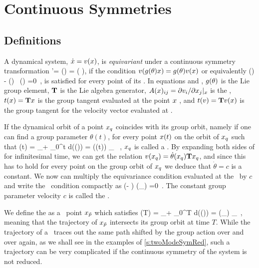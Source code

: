 \section{Continuous Symmetries}
\label{s:symm}

\subsection{Definitions}

A dynamical system, $\dot{x}=v(x)$, is \emph{equivariant} under a continuous
symmetry transformation
\beq
	\ssp'= \LieEl (\theta) \ssp = \exp\left( \theta \Lg\right)\ssp,
if the condition
$v(g (\theta) x ) = g (\theta) v( x ) $
or equivalently 
\beq
  \groupTan(\vel)  - \Mvar(\ssp) \, \groupTan(\ssp) =0
  \,,
is satisfied for every point of its \statesp . In equations 
and , $g (\theta)$ is the Lie group element, $\mathbf{T}$
is the Lie algebra generator, $A(x)_{ij} = {\partial v_i}/{\partial x_j} |_x$
is the \stabmat , $ t(x) = \mathbf{T} x $ is the group tangent evaluated
at the point $x$ , and $ t(v) = \mathbf{T} v(x) $ is the group
tangent for the velocity vector evaluated at \ssp. 

\label{s:relatives}

If the dynamical orbit of a point $x_q$ coincides with its group
orbit, namely if one can find a group parameter $\theta (t)$, for every point $x (t)$
on the orbit of $x_q$ such that
\beq
  \ssp (t) = \ssp_\stagn + \int_0^t d\tau \vel(\ssp (\tau)) = \LieEl (\theta (t)) \ssp_\stagn
  \, ,
 $x_q$ is called a \emph{ \reqv }. By expanding both sides of 
for infinitesimal time, we can get the relation
$v(x_q) = \dot{\theta}(x_q) \mathbf{T} x_q$,
and since this has to hold for every point on the group orbit of $x_q$
we deduce that $\dot{\theta} = c$ is a constant. We now can multiply the equivariance
condition  evaluated at the \reqv\ by $c$ and write the
\reqv\ condition compactly as
\beq
(\velRel \Lg - \Mvar ) \vel (\ssp_\stagn) =0
\,.
The constant group parameter velocity $c$  is called the \phaseVel .

We define the  \emph{ \rpo} as a \statesp\ point $x_{\tilde{p}}$ which satisfies
\beq
  \ssp (T) = \ssp_\rpprime  + \int_0^T d\tau \vel(\ssp (\tau)) = \LieEl (\theta_\rpprime ) \ssp_\rpprime
  \,,
meaning that the trajectory of $x_{\tilde{p}}$ intersects its group orbit at
time $T$. While the trajectory of a \rpo\ traces out the same path shifted
by the group action over and over again, as we shall see in the examples of
\ref{s:twoModeSymRed}, such a trajectory can be very complicated if the
continuous symmetry of the system is not reduced.

